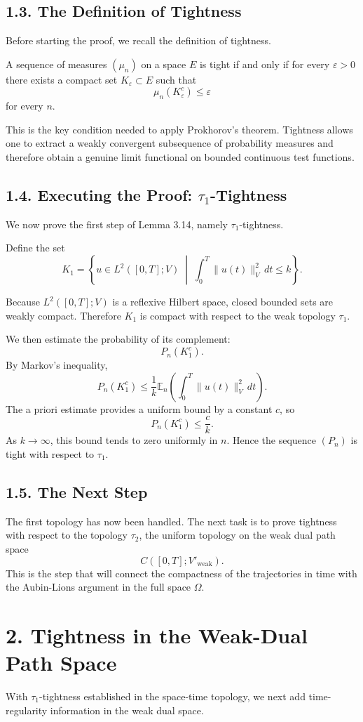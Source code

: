 \documentclass[11pt]{article}
\theoremstyle{definition}
\theoremstyle{remark}
\begin{document}
\subsection*{1.3. The Definition of Tightness}
Before starting the proof, we recall the definition of tightness.

A sequence of measures \((\mu_n)\) on a space \(E\) is tight if and only if for every \(\varepsilon>0\) there exists a compact set \(K_\varepsilon\subset E\) such that
\[
\mu_n(K_\varepsilon^c)\le \varepsilon
\]
for every \(n\).

This is the key condition needed to apply Prokhorov's theorem. Tightness allows one to extract a weakly convergent subsequence of probability measures and therefore obtain a genuine limit functional on bounded continuous test functions.

\subsection*{1.4. Executing the Proof: \(\tau_1\)-Tightness}
We now prove the first step of Lemma 3.14, namely \(\tau_1\)-tightness.

Define the set
\[
K_1
=
\left\{
u\in L^2([0,T];V)
\;\middle|\;
\int_0^T \|u(t)\|_V^2\,dt\le k
\right\}.
\]

Because \(L^2([0,T];V)\) is a reflexive Hilbert space, closed bounded sets are weakly compact. Therefore \(K_1\) is compact with respect to the weak topology \(\tau_1\).

We then estimate the probability of its complement:
\[
P_n(K_1^c).
\]
By Markov's inequality,
\[
P_n(K_1^c)
\le
\frac{1}{k}
\mathbb E_n\left(
\int_0^T \|u(t)\|_V^2\,dt
\right).
\]
The a priori estimate provides a uniform bound by a constant \(c\), so
\[
P_n(K_1^c)\le \frac{c}{k}.
\]
As \(k\to\infty\), this bound tends to zero uniformly in \(n\). Hence the sequence \((P_n)\) is tight with respect to \(\tau_1\).

\subsection*{1.5. The Next Step}
The first topology has now been handled. The next task is to prove tightness with respect to the topology \(\tau_2\), the uniform topology on the weak dual path space
\[
C([0,T];V'_{\mathrm{weak}}).
\]
This is the step that will connect the compactness of the trajectories in time with the Aubin-Lions argument in the full space \(\Omega\).

\section*{2. Tightness in the Weak-Dual Path Space}
With \(\tau_1\)-tightness established in the space-time topology, we next add time-regularity information in the weak dual space.
\end{document}
